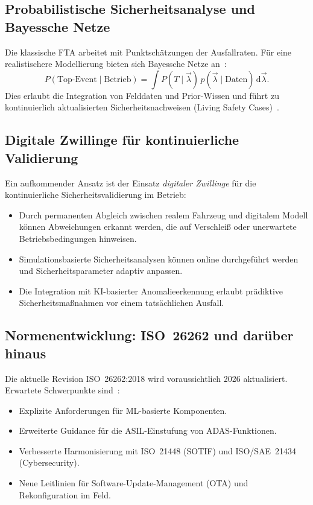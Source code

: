 ﻿\documentclass[a4paper,12pt]{article}
\theoremstyle{definition}
\begin{document}
\subsection{Probabilistische Sicherheitsanalyse und Bayessche Netze}

Die klassische FTA arbeitet mit Punktschätzungen der Ausfallraten.
Für eine realistischere Modellierung bieten sich Bayessche Netze
an~\cite{neil_2016}:
\[
  P(\text{Top-Event} \mid \text{Betrieb})
  = \int P(T \mid \vec{\lambda})\,
    p(\vec{\lambda} \mid \text{Daten})\,\mathrm{d}\vec{\lambda}.
\]
Dies erlaubt die Integration von Felddaten und Prior-Wissen und
führt zu kontinuierlich aktualisierten Sicherheitsnachweisen
(Living Safety Cases)~\cite{bishop_2017}.

\subsection{Digitale Zwillinge für kontinuierliche Validierung}

Ein aufkommender Ansatz ist der Einsatz \emph{digitaler Zwillinge}
für die kontinuierliche Sicherheitsvalidierung im Betrieb:

\begin{itemize}
  \item Durch permanenten Abgleich zwischen realem Fahrzeug und
        digitalem Modell können Abweichungen erkannt werden, die
        auf Verschleiß oder unerwartete Betriebsbedingungen hinweisen.
  \item Simulationsbasierte Sicherheitsanalysen können online
        durchgeführt werden und Sicherheitsparameter adaptiv anpassen.
  \item Die Integration mit KI-basierter Anomalieerkennung erlaubt
        prädiktive Sicherheitsmaßnahmen vor einem tatsächlichen
        Ausfall.
\end{itemize}

\subsection{Normenentwicklung: ISO~26262 und darüber hinaus}

Die aktuelle Revision ISO~26262:2018 wird voraussichtlich 2026
aktualisiert. Erwartete Schwerpunkte sind~\cite{autosar_2023}:
\begin{itemize}
  \item Explizite Anforderungen für ML-basierte Komponenten.
  \item Erweiterte Guidance für die ASIL-Einstufung von
        ADAS-Funktionen.
  \item Verbesserte Harmonisierung mit ISO~21448 (SOTIF) und
        ISO/SAE~21434 (Cybersecurity).
  \item Neue Leitlinien für Software-Update-Management (OTA) und
        Rekonfiguration im Feld.
\end{itemize}
\end{document}
